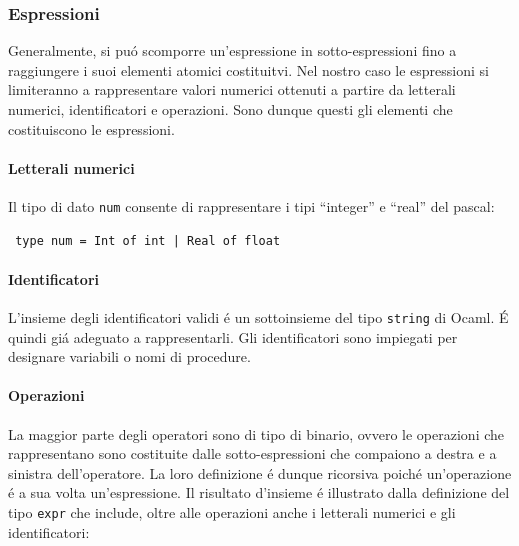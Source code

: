 \documentclass[a4paper,10pt]{article}
\begin{document}
\subsubsection{Espressioni}
Generalmente, si pu\'o scomporre un'espressione in sotto-espressioni fino a
raggiungere i suoi elementi atomici costituitvi. Nel nostro caso le espressioni
si limiteranno a rappresentare valori numerici ottenuti a partire da letterali
numerici, identificatori e operazioni.
Sono dunque questi gli elementi che costituiscono le espressioni.

\paragraph{Letterali numerici}
Il tipo di dato \verb|num| consente di rappresentare i tipi ``integer'' e
``real'' del pascal:
\begin{verbatim}
 type num = Int of int | Real of float
\end{verbatim}

\paragraph{Identificatori}
L'insieme degli identificatori validi \'e un sottoinsieme del tipo \verb|string|
di Ocaml. \'E quindi gi\'a adeguato a rappresentarli. Gli identificatori sono
impiegati per designare variabili o nomi di procedure.

\paragraph{Operazioni}
La maggior parte degli operatori sono di tipo di binario, ovvero le
operazioni che rappresentano sono costituite dalle sotto-espressioni che
compaiono a destra e a sinistra dell'operatore. La loro definizione \'e dunque
ricorsiva poich\'e un'operazione \'e a sua volta un'espressione.
Il risultato d'insieme \'e illustrato dalla definizione del tipo \verb|expr|
che include, oltre alle operazioni anche i letterali numerici e gli
identificatori:\\
\end{document}

